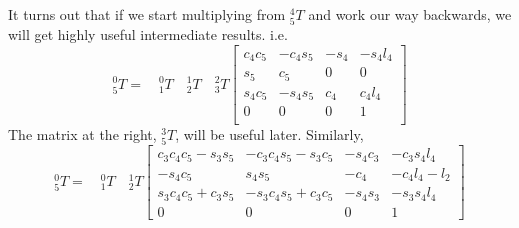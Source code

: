 \begin{ExampleCont}
It turns out that if we start multiplying from $^4_5T$ and work our way backwards, we will get highly
useful intermediate results. i.e.
\[
^0_5T= \quad ^0_1T \quad ^1_2T \quad ^2_3T
\left[
\begin{array}{cccc}
 c_4c_5          & -c_4s_5             & -s_4           & -s_4l_4           \\
 s_5             & c_5                 & 0              & 0                 \\
 s_4c_5          & -s_4s_5             & c_4            & c_4l_4            \\
 0 & 0 & 0 & 1 \\
\end{array}
\right]
\]
The matrix at the right, $^3_5T$, will be useful later.    Similarly,	%
\[
^0_5T= \quad ^0_1T \quad ^1_2T
\left[
\begin{array}{cccc}
c_3c_4c_5-s_3s_5 & -c_3c_4s_5-s_3c_5 & -s_4c_3 & -c_3s_4l_4 \\
-s_4c_5 & s_4s_5 & -c_4 & -c_4l_4-l_2 \\
s_3c_4c_5+c_3s_5 & -s_3c_4s_5+c_3c_5 & -s_4s_3 & -s_3s_4l_4 \\
0 & 0 & 0 & 1
\end{array}
\right]
\]


\end{ExampleCont}
